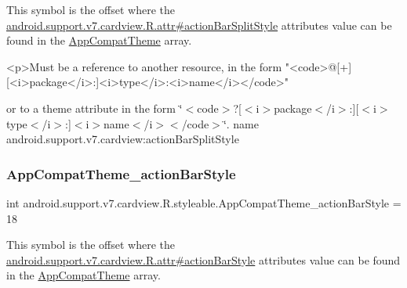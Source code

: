 This symbol is the offset where the \hyperlink{classandroid_1_1support_1_1v7_1_1cardview_1_1R_1_1attr_aad15ddf6cf457cf83708b86466ad7f8d}{android.\+support.\+v7.\+cardview.\+R.\+attr\#action\+Bar\+Split\+Style} attribute\textquotesingle{}s value can be found in the \hyperlink{classandroid_1_1support_1_1v7_1_1cardview_1_1R_1_1styleable_a52e6f69f954ecc2622d72c0b4d298938}{App\+Compat\+Theme} array.

\begin{DoxyVerb}      <p>Must be a reference to another resource, in the form "<code>@[+][<i>package</i>:]<i>type</i>:<i>name</i></code>"
\end{DoxyVerb}
 or to a theme attribute in the form \char`\"{}$<$code$>$?\mbox{[}$<$i$>$package$<$/i$>$\+:\mbox{]}\mbox{[}$<$i$>$type$<$/i$>$\+:\mbox{]}$<$i$>$name$<$/i$>$$<$/code$>$\char`\"{}.  name android.\+support.\+v7.\+cardview\+:action\+Bar\+Split\+Style \mbox{\label{classandroid_1_1support_1_1v7_1_1cardview_1_1R_1_1styleable_a6ee7326e5eb8f855d6bb21269c3cd5c4}} 
\subsubsection{\texorpdfstring{App\+Compat\+Theme\+\_\+action\+Bar\+Style}{AppCompatTheme\_actionBarStyle}}
{\footnotesize\ttfamily int android.\+support.\+v7.\+cardview.\+R.\+styleable.\+App\+Compat\+Theme\+\_\+action\+Bar\+Style = 18\hspace{0.3cm}{\ttfamily [static]}}

This symbol is the offset where the \hyperlink{classandroid_1_1support_1_1v7_1_1cardview_1_1R_1_1attr_a0a184a5026bb06941c05d30ef94a8c6c}{android.\+support.\+v7.\+cardview.\+R.\+attr\#action\+Bar\+Style} attribute\textquotesingle{}s value can be found in the \hyperlink{classandroid_1_1support_1_1v7_1_1cardview_1_1R_1_1styleable_a52e6f69f954ecc2622d72c0b4d298938}{App\+Compat\+Theme} array.

